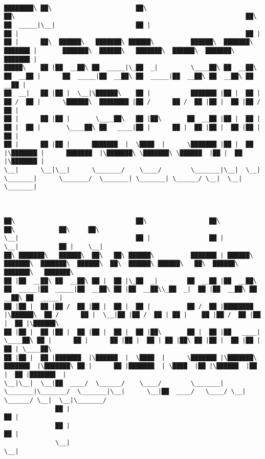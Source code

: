 \documentclass[varwidth=\maxdimen,margin=0.5cm,multi={verbatim}]{standalone}
\begin{document}
\begin{verbatim}

████████\ ██\                       ██\                                     ██\                                                               ██\
██  _____|\__|                      ██ |                                    ██ |                                                              ██ |
██ |      ██\  ██████\   ███████\ ██████\          ██████\  ███████\   ███████ |       ███████\  ██████\   ███████\  ██████\  ███████\   ███████ |
█████\    ██ |██  __██\ ██  _____|\_██  _|         \____██\ ██  __██\ ██  __██ |      ██  _____|██  __██\ ██  _____|██  __██\ ██  __██\ ██  __██ |
██  __|   ██ |██ |  \__|\██████\    ██ |           ███████ |██ |  ██ |██ /  ██ |      \██████\  ████████ |██ /      ██ /  ██ |██ |  ██ |██ /  ██ |
██ |      ██ |██ |       \____██\   ██ |██\       ██  __██ |██ |  ██ |██ |  ██ |       \____██\ ██   ____|██ |      ██ |  ██ |██ |  ██ |██ |  ██ |
██ |      ██ |██ |      ███████  |  \████  |      \███████ |██ |  ██ |\███████ |      ███████  |\███████\ \███████\ \██████  |██ |  ██ |\███████ |
\__|      \__|\__|      \_______/    \____/        \_______|\__|  \__| \_______|      \_______/  \_______| \_______| \______/ \__|  \__| \_______|



██\                                 ██\                 ██\                                         ██\            ██\     ██\
\__|                                ██ |                ██ |                                        \__|           ██ |    \__|
██\ ███████\   ██████\  ██\   ██\ ██████\          ███████ | ██████\   ███████\  ███████\  ██████\  ██\  ██████\ ██████\   ██\  ██████\  ███████\   ███████\
██ |██  __██\ ██  __██\ ██ |  ██ |\_██  _|        ██  __██ |██  __██\ ██  _____|██  _____|██  __██\ ██ |██  __██\\_██  _|  ██ |██  __██\ ██  __██\ ██  _____|
██ |██ |  ██ |██ /  ██ |██ |  ██ |  ██ |          ██ /  ██ |████████ |\██████\  ██ /      ██ |  \__|██ |██ /  ██ | ██ |    ██ |██ /  ██ |██ |  ██ |\██████\
██ |██ |  ██ |██ |  ██ |██ |  ██ |  ██ |██\       ██ |  ██ |██   ____| \____██\ ██ |      ██ |      ██ |██ |  ██ | ██ |██\ ██ |██ |  ██ |██ |  ██ | \____██\
██ |██ |  ██ |███████  |\██████  |  \████  |      \███████ |\███████\ ███████  |\███████\ ██ |      ██ |███████  | \████  |██ |\██████  |██ |  ██ |███████  |
\__|\__|  \__|██  ____/  \______/    \____/        \_______| \_______|\_______/  \_______|\__|      \__|██  ____/   \____/ \__| \______/ \__|  \__|\_______/
              ██ |                                                                                      ██ |
              ██ |                                                                                      ██ |
              \__|                                                                                      \__|




\end{verbatim}
\end{document}
